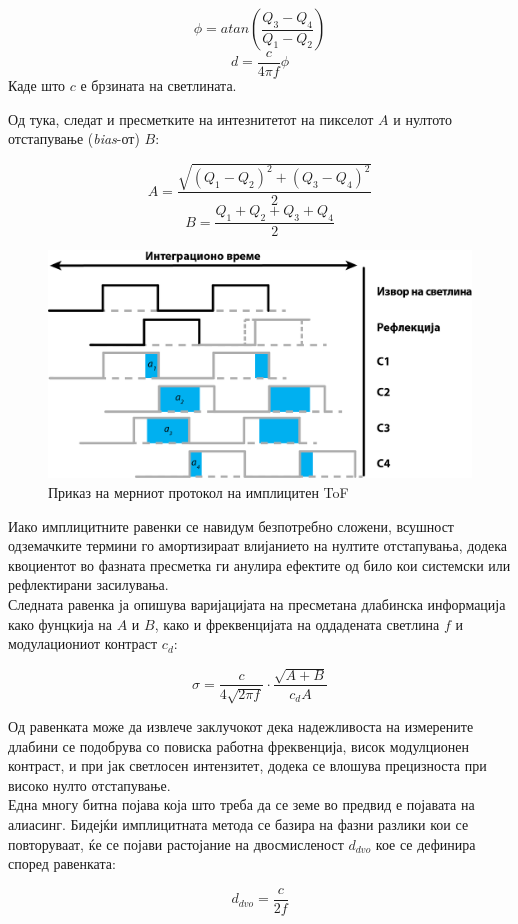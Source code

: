 \documentclass[12pt]{article}
\begin{document}
		$$ \phi = atan(\frac{Q_3 - Q_4}{Q_1 - Q_2}) $$
		$$ d = \frac{c}{4\pi f} \phi $$
		Каде што $c$ е брзината на светлината.


		Од тука, следат и пресметките на интезнитетот на пикселот $A$ и нултото отстапување (\textit{bias}-от) $B$:

		$$ A = \frac{\sqrt{(Q_1 - Q_2)^2  + (Q_3 - Q_4)^2}}{2} $$
		$$ B = \frac{Q_1 + Q_2 + Q_3 + Q_4}{2} $$


		\begin{figure}[H]
			\includegraphics[width=0.75\linewidth]{./images/CWToF.png}
			\centering
			\caption{Приказ на мерниот протокол на имплицитен ToF \cite{tofwhitepaper}}
			\label{fig:CWToF.png}
			\end{figure}

		Иако имплицитните равенки се навидум безпотребно сложени, всушност одземачките термини го амортизираат влијанието на нултите отстапувања, додека квоциентот во фазната пресметка ги анулира ефектите од било кои системски или рефлектирани засилувања.\\
		Следната равенка ја опишува варијацијата на пресметана длабинска информација како фунцкија на $A$ и $B$, како и фреквенцијата на оддадената светлина $f$ и модулациониот контраст $c_d$:

		$$ \sigma = \frac{c}{4\sqrt{2\pi f}} \cdot \frac{\sqrt{A+B}}{c_d A} $$

		Од равенката може да извлече заклучокот дека надежливоста на измерените длабини се подобрува со повиска работна фреквенција, висок модулционен контраст, и при јак светлосен интензитет, додека се влошува прецизноста при високо нулто отстапување.
		\\
		Една многу битна појава која што треба да се земе во предвид е појавата на алиасинг. Бидејќи имплицитната метода се базира на фазни разлики кои се повторуваат, ќе се појави растојание на двосмисленост $d_{dvo}$ кое се дефинира според равенката:

		$$ d_{dvo} = \frac{c}{2f} $$
\end{document}

